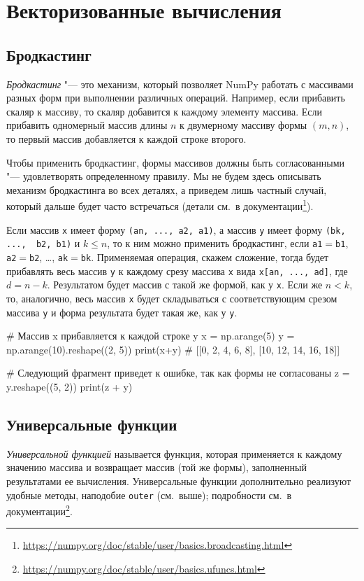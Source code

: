 \section{Векторизованные вычисления}
\subsection{Бродкастинг}
\emph{Бродкастинг} "--- это механизм, который позволяет NumPy работать с массивами разных форм при выполнении различных операций.
Например, если прибавить скаляр к массиву, то скаляр добавится к каждому элементу массива.
Если прибавить одномерный массив длины $n$ к двумерному массиву формы $(m,n)$, то первый массив добавляется к каждой строке второго.

Чтобы применить бродкастинг, формы массивов должны быть согласованными "--- удовлетворять определенному правилу.
Мы не будем здесь описывать механизм бродкастинга во всех деталях, а приведем лишь частный случай, который дальше будет часто встречаться (детали см.~в документации\footnote{\url{https://numpy.org/doc/stable/user/basics.broadcasting.html}}).

Если массив \verb"x" имеет форму \verb"(an, ..., a2, a1)", а массив \verb"y" имеет форму \verb"(bk, ...,  b2, b1)" и $k \le n$, то к ним можно применить бродкастинг, если \verb"a1"$=$\verb"b1", \verb"a2"$=$\verb"b2", \ldots, \verb"ak"$=$\verb"bk". 
Применяемая операция, скажем сложение, тогда будет прибавлять весь массив \verb"y" к каждому срезу массива \verb"x" вида \verb"x[an, ..., ad]", где $d=n-k$. Результатом будет массив с такой же формой, как у \verb"x". 
Если же $n < k$, то, аналогично, весь массив \verb"x" будет складываться с соответствующим срезом массива \verb"y" и форма результата будет такая же, как у \verb"y".

\begin{python}
# Массив x прибавляется к каждой строке y
x = np.arange(5)
y = np.arange(10).reshape((2, 5))
print(x+y)  # [[0,  2,  4,  6,  8], [10, 12, 14, 16, 18]]

# Следующий фрагмент приведет к ошибке, так как формы не согласованы
z = y.reshape((5, 2))
print(z + y)
\end{python}


\subsection{Универсальные функции}
\emph{Универсальной функцией} называется функция, которая применяется к каждому значению массива и возвращает массив (той же формы), заполненный результатами ее вычисления.
Универсальные функции дополнительно реализуют удобные методы, наподобие \verb"outer" (см.~выше); подробности см.~в документации\footnote{\url{https://numpy.org/doc/stable/user/basics.ufuncs.html}}.

